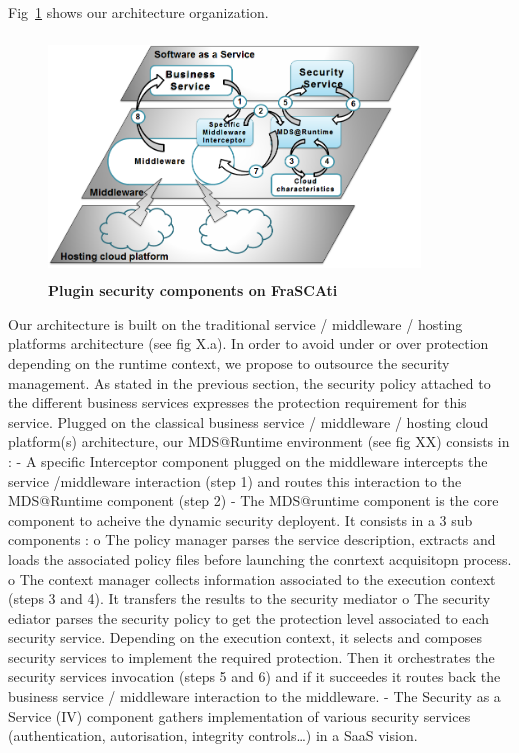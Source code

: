 \documentclass[runningheads,a4paper]{llncs}
\begin{document}
 Fig~\ref{fig:archi} shows our architecture organization. 
\begin{figure}[ht]  
\centering
\includegraphics[height=180pt, width=280pt]{architecture1.PNG}
\caption{\textbf{Plugin security components on FraSCAti}}
\label{fig:archi}
\end{figure}


Our architecture is built on the traditional service / middleware / hosting platforms architecture (see fig X.a). In order to avoid under or over protection depending on the runtime context, we propose to outsource the security management. As stated in the previous section, the security policy attached to the different business services expresses the protection requirement for this service. Plugged on the classical business service / middleware / hosting cloud platform(s) architecture, our MDS@Runtime environment (see fig XX) consists in :
-	A specific Interceptor component plugged on the middleware intercepts the service /middleware interaction (step 1) and routes this interaction to the MDS@Runtime component (step 2) 
-	The MDS@runtime component  is the core component to acheive the dynamic security deployent. It consists in a 3 sub components : 
o	The policy manager parses the service description, extracts and loads the associated policy files before launching the conrtext acquisitopn process.
o	 The context manager collects information associated to the execution context (steps 3 and 4). It transfers the results to the security mediator
o	The security ediator parses the security policy to get the protection level associated to each security service. Depending on the execution context, it selects and composes security services to implement the required protection. Then it orchestrates the security services invocation (steps 5 and 6) and if it succeedes it routes back the business service / middleware interaction to the middleware.
-	The Security as a Service (IV) component gathers implementation of various security services (authentication, autorisation, integrity controls…) in a SaaS vision.
\end{document}
